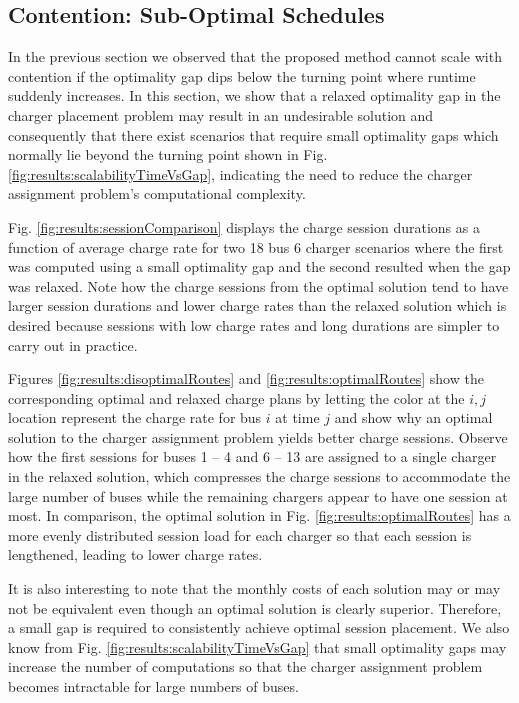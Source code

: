 \subsection{Contention: Sub-Optimal Schedules}
In the previous section we observed that the proposed method cannot scale with contention if the optimality gap dips below the turning point where runtime suddenly increases. In this section, we show that a relaxed optimality gap in the charger placement problem may result in an undesirable solution and consequently that there exist scenarios that require small optimality gaps which normally lie beyond the turning point shown in Fig. \ref{fig:results:scalabilityTimeVsGap}, indicating the need to reduce the charger assignment problem's computational complexity. 
\par Fig. \ref{fig:results:sessionComparison} displays the charge session durations as a function of average charge rate for two 18 bus 6 charger scenarios where the first was computed using a small optimality gap and the second resulted when the gap was relaxed. Note how the charge sessions from the optimal solution tend to have larger session durations and lower charge rates than the relaxed solution which is desired because sessions with low charge rates and long durations are simpler to carry out in practice. 
\par Figures \ref{fig:results:disoptimalRoutes} and \ref{fig:results:optimalRoutes} show the corresponding optimal and relaxed charge plans by letting the color at the $i,j$ location represent the charge rate for bus $i$ at time $j$ and show why an optimal solution to the charger assignment problem yields better charge sessions. Observe how the first sessions for buses 1 -- 4 and 6 -- 13 are assigned to a single charger in the relaxed solution, which compresses the charge sessions to accommodate the large number of buses while the remaining chargers appear to have one session at most. In comparison, the optimal solution in Fig. \ref{fig:results:optimalRoutes} has a more evenly distributed session load for each charger so that each session is lengthened, leading to lower charge rates. 
\par It is also interesting to note that the monthly costs of each solution may or may not be equivalent even though an optimal solution is clearly superior. Therefore, a small gap is required to consistently achieve optimal session placement. We also know from Fig. \ref{fig:results:scalabilityTimeVsGap} that small optimality gaps may increase the number of computations so that the charger assignment problem becomes intractable for large numbers of buses.  

 

